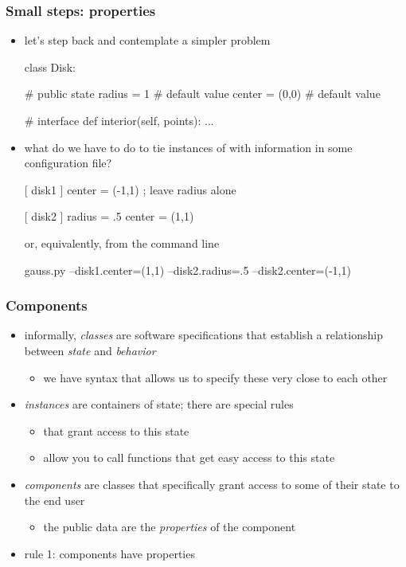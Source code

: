 \begin{frame}[fragile]
%
  \frametitle{Small steps: properties}
%
  \begin{itemize}
  \item let's step back and contemplate a simpler problem
%
  \begin{ipython}{}
class Disk:

    # public state
    radius = 1     # default value
    center = (0,0) # default value

    # interface
    def interior(self, points):
        ...
  \end{ipython}
%
\item what do we have to do to tie instances of  with information in some
  configuration file?
%
  \begin{icfg}{}
    [ disk1 ]
    center = (-1,1)   ; leave {radius} alone

    [ disk2 ]
    radius = .5
    center = (1,1)
  \end{icfg}
%
  or, equivalently, from the command line
%
  \begin{ish}{}
gauss.py --disk1.center=(1,1) --disk2.radius=.5 --disk2.center=(-1,1)
  \end{ish}
%
  \end{itemize}
%
\end{frame}

\begin{frame}
%
  \frametitle{Components}
%
  \begin{itemize}
%
  \item informally, \emph{classes} are software specifications that establish a relationship
    between \emph{state} and \emph{behavior}
    \begin{itemize}
    \item we have syntax that allows us to specify these very close to each other
    \end{itemize}
%
  \item \emph{instances} are containers of state; there are special rules
    \begin{itemize}
    \item that grant access to this state
    \item allow you to call functions that get easy access to this state
    \end{itemize}
%
  \item \emph{components} are classes that specifically grant access to some of their state to
    the end user
    \begin{itemize}
    \item the public data are the \emph{properties} of the component
    \end{itemize}
%
  \item rule 1: components have properties
%
  \end{itemize}
%
\end{frame}

